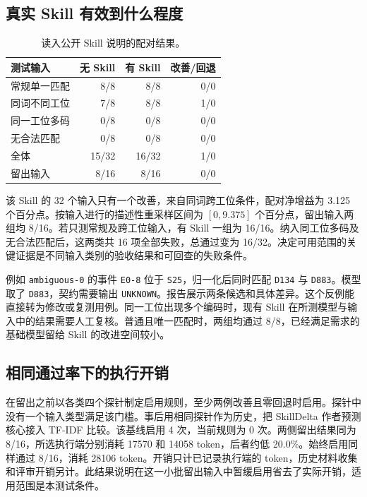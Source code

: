 \documentclass[final,5p,twocolumn,10pt]{elsarticle}
\newcommand{\code}[1]{\texttt{#1}}
\begin{document}
\subsection{真实 Skill 有效到什么程度}

\begin{table}[!t]
\centering\small\setlength{\tabcolsep}{3pt}
\caption{读入公开 Skill 说明的配对结果。}
\label{tab:actual}
\begin{tabularx}{\columnwidth}{@{}Yrrr@{}}
\toprule
测试输入 & 无 Skill & 有 Skill & 改善/回退 \\
\midrule
常规单一匹配 & 8/8 & 8/8 & 0/0 \\
同词不同工位 & 7/8 & 8/8 & 1/0 \\
同一工位多码 & 0/8 & 0/8 & 0/0 \\
无合法匹配 & 0/8 & 0/8 & 0/0 \\
全体 & 15/32 & 16/32 & 1/0 \\
留出输入 & 8/16 & 8/16 & 0/0 \\
\bottomrule
\end{tabularx}
\end{table}

该 Skill 的 32 个输入只有一个改善，来自同词跨工位条件，配对净增益为 3.125 个百分点。按输入进行的描述性重采样区间为 $[0,9.375]$ 个百分点，留出输入两组均 8/16。若只测常规及跨工位输入，有 Skill 一组为 16/16。纳入同工位多码及无合法匹配后，这两类共 16 项全部失败，总通过变为 16/32。决定可用范围的关键证据是不同输入类别的验收结果和可回查的失败条件。

例如 \code{ambiguous-0} 的事件 \code{E0-8} 位于 \code{S25}，归一化后同时匹配 \code{D134} 与 \code{D883}。模型取了 \code{D883}，契约需要输出 \code{UNKNOWN}。报告展示两条候选和具体差异。这个反例能直接转为修改或复测用例。同一工位出现多个编码时，现有 Skill 在所测模型与输入中的结果需要人工复核。普通且唯一匹配时，两组均通过 8/8，已经满足需求的基础模型留给 Skill 的改进空间较小。

\subsection{相同通过率下的执行开销}

在留出之前以各类四个探针制定启用规则，至少两例改善且零回退时启用。探针中没有一个输入类型满足该门槛。事后用相同探针作为历史，把 SkillDelta 作者预测核心接入 TF-IDF 比较。该基线启用 4 次，当前规则为 0 次。两侧留出结果同为 8/16，所选执行端分别消耗 17570 和 14058 token，后者约低 20.0\%。始终启用同样通过 8/16，消耗 28106 token。开销只计已记录执行端的 token，历史材料收集和评审开销另计。此结果说明在这一小批留出输入中暂缓启用省去了实际开销，适用范围是本测试条件。
\end{document}
